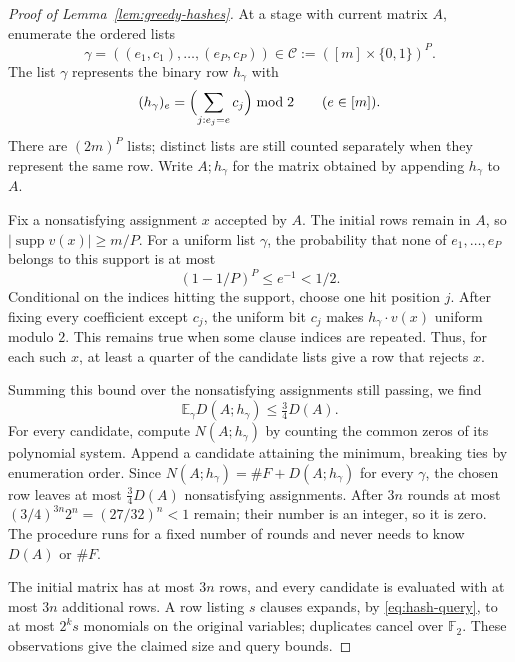 \begin{proof}[Proof of Lemma~\ref{lem:greedy-hashes}]
At a stage with current matrix $A$, enumerate the ordered lists
\[
 \gamma=((e_1,c_1),\ldots,(e_P,c_P))
 \in\mathcal C:=([m]\times\{0,1\})^P.
\]
The list $\gamma$ represents the binary row $h_\gamma$ with
\[
 (h_\gamma)_e=
 \Bigl(\sum_{j:e_j=e}c_j\Bigr)\bmod2
 \qquad(e\in[m]).
\]
There are $(2m)^P$ lists; distinct lists are still counted separately
when they represent the same row. Write $A;h_\gamma$ for the matrix obtained by appending $h_\gamma$ to $A$.

Fix a nonsatisfying assignment $x$ accepted by $A$. The initial
rows remain in $A$, so
$|\operatorname{supp}v(x)|\ge m/P$.
For a uniform list $\gamma$, the probability that none of
$e_1,\ldots,e_P$ belongs to this support is at most
\[
 (1-1/P)^P\le e^{-1}<1/2.
\]
Conditional on the indices hitting the support, choose one hit
position $j$. After fixing every coefficient except $c_j$, the
uniform bit $c_j$ makes $h_\gamma\cdot v(x)$ uniform modulo $2$.
This remains true when some clause indices are repeated.
Thus, for each such $x$, at least a quarter of the candidate lists
give a row that rejects $x$.

Summing this bound over the nonsatisfying assignments still passing,
we find
\[
 \mathbb E_\gamma D(A;h_\gamma)\le\tfrac34 D(A).
\]
For every candidate, compute $N(A;h_\gamma)$ by counting the common
zeros of its polynomial system. Append a candidate attaining the
minimum, breaking ties by enumeration order. Since
$N(A;h_\gamma)=\#F+D(A;h_\gamma)$ for every $\gamma$, the chosen row
leaves at most $\tfrac34 D(A)$ nonsatisfying assignments. After $3n$
rounds at most $(3/4)^{3n}2^n=(27/32)^n<1$ remain; their number is
an integer, so it is zero. The procedure runs for a fixed number of
rounds and never needs to know $D(A)$ or $\#F$.

The initial matrix has at most $3n$ rows, and every candidate is
evaluated with at most $3n$ additional rows. A row listing $s$
clauses expands, by \eqref{eq:hash-query}, to at most $2^k s$
monomials on the original variables; duplicates cancel over
$\mathbb F_2$. These observations give the claimed size and query
bounds.
\end{proof}

